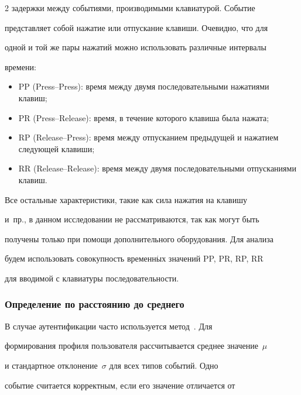 \begin{multicols}{2}
задержки между событиями, производимыми клавиатурой. Событие

пред\-став\-ля\-ет собой нажатие или отпускание клавиши. Очевидно, что для

одной и той же пары нажатий можно использовать различные интервалы

времени:

\begin{itemize}

    \item PP (Press--Press): время между двумя последовательными нажатиями клавиш;

    \item PR (Press--Release): время, в течение которого клавиша была нажата;

    \item RP (Release--Press): время между отпусканием предыдущей и нажатием следующей клавиши;

    \item RR (Release--Release): время между двумя последовательными отпусканиями клавиш.

\end{itemize}

Все остальные характеристики, такие как сила нажатия на клавишу 

и~пр., в данном исследовании не рассматриваются, так как могут быть

получены только при помощи дополнительного оборудования. Для анализа

будем использовать совокупность временн$\acute{\mbox{ы}}$х значений PP, PR, RP, RR

для вводимой с клавиатуры последовательности.



\vspace*{-4pt}



\subsubsection{Определение по расстоянию до среднего}



В случае аутентификации часто используется метод~\cite{legett}. Для

формирования профиля пользователя рассчитывается среднее значение~$\mu$ 

и стандартное отклонение~$\sigma$ для всех типов событий. Одно

событие считается корректным, если его значение отличается от


\end{multicols}

